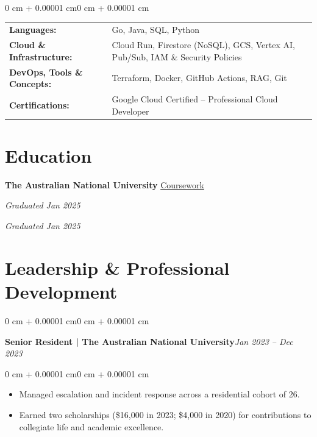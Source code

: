 \documentclass[10pt, letterpaper]{article}
\newenvironment{highlights}{
    \begin{itemize}[
        topsep=0.10 cm,
        parsep=0.10 cm,
        partopsep=0pt,
        itemsep=0pt,
        leftmargin=0 cm + 10pt
    ]
}{
    \end{itemize}
}
\newenvironment{onecolentry}{
    \begin{adjustwidth}{0 cm + 0.00001 cm}{0 cm + 0.00001 cm}
}{
    \end{adjustwidth}
}
\let\hrefWithoutArrow\href
\begin{document}
\begin{onecolentry}
    \begin{tabularx}{\linewidth}{@{} l X @{}}
        \textbf{Languages:}           & Go, Java, SQL, Python \\[0.2cm]
        \textbf{Cloud \& Infrastructure:} & Cloud Run, Firestore (NoSQL), GCS, Vertex AI, Pub/Sub, IAM \& Security Policies \\[0.2cm]
        \textbf{DevOps, Tools \& Concepts:}     & Terraform, Docker, GitHub Actions, RAG, Git  \\[0.2cm]
        \textbf{Certifications:}      & Google Cloud Certified – Professional Cloud Developer      \\[0.2cm]
    \end{tabularx}
\end{onecolentry}

\section{Education}
\vspace{0.1cm}

\textbf{The Australian National University}\hfill{} \hrefWithoutArrow{https://gitlab.com/llllllllleong/my-individual-works}{Coursework}%


\vspace{0.1cm}

\hspace{0.5cm}{Bachelor of Actuarial Studies}\hfill{} \textit{Graduated Jan 2025}

\vspace{0.1cm}

\hspace{0.5cm}{Bachelor of Finance (Quantitative Finance)}\hfill{} \textit{Graduated Jan 2025}

\section{Leadership \& Professional Development}
\vspace{0.1cm}

\begin{onecolentry}
    \textbf{Senior Resident | The Australian National University}\hfill \textit{Jan 2023 – Dec 2023}
\end{onecolentry}

\vspace{0.10 cm}

\begin{onecolentry}
    \begin{highlights}
        \item Managed escalation and incident response across a residential cohort of 26.
        \item Earned two scholarships (\$16,000 in 2023; \$4,000 in 2020) for contributions to collegiate life and academic excellence.
    \end{highlights}
\end{onecolentry}
\end{document}
